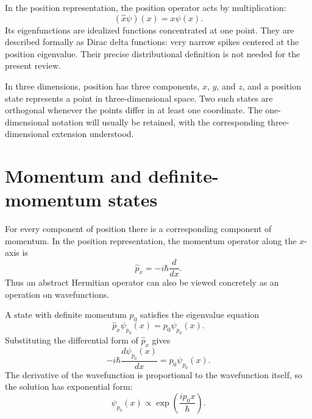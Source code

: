In the position representation, the position operator acts by multiplication:
\begin{equation}
(\hat x\psi)(x)=x\psi(x).
\end{equation}
Its eigenfunctions are idealized functions concentrated at one point. They are described formally as Dirac delta functions: very narrow spikes centered at the position eigenvalue. Their precise distributional definition is not needed for the present review.

In three dimensions, position has three components, \(x\), \(y\), and \(z\), and a position state represents a point in three-dimensional space. Two such states are orthogonal whenever the points differ in at least one coordinate. The one-dimensional notation will usually be retained, with the corresponding three-dimensional extension understood.

\section{Momentum and definite-momentum states}

For every component of position there is a corresponding component of momentum. In the position representation, the momentum operator along the \(x\)-axis is
\begin{equation}
\hat p_x=-i\hbar\frac{d}{dx}.
\end{equation}
Thus an abstract Hermitian operator can also be viewed concretely as an operation on wavefunctions.

A state with definite momentum \(p_0\) satisfies the eigenvalue equation
\begin{equation}
\hat p_x\psi_{p_0}(x)=p_0\psi_{p_0}(x).
\end{equation}
Substituting the differential form of \(\hat p_x\) gives
\begin{equation}
-i\hbar\frac{d\psi_{p_0}(x)}{dx}
=p_0\psi_{p_0}(x).
\end{equation}
The derivative of the wavefunction is proportional to the wavefunction itself, so the solution has exponential form:
\begin{equation}
\psi_{p_0}(x)\propto
\exp\left(\frac{ip_0x}{\hbar}\right).
\end{equation}

\begin{classroomqa}
\end{classroomqa}

